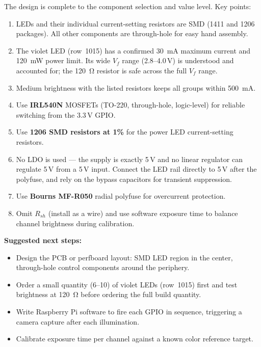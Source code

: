 \documentclass[12pt,letterpaper]{article}
\begin{document}
The design is complete to the component selection and value level. Key points:

\begin{enumerate}[leftmargin=2em]
  \item LEDs and their individual current-setting resistors are SMD (1411 and 1206 packages).
    All other components are through-hole for easy hand assembly.
  \item The violet LED (row~1015) has a confirmed 30~mA maximum current and 120~mW power
    limit. Its wide $V_f$ range (2.8--4.0\,V) is understood and accounted for; the
    120~\si{\ohm} resistor is safe across the full $V_f$ range.
  \item Medium brightness with the listed resistors keeps all groups within 500~mA.
  \item Use \textbf{IRL540N} MOSFETs (TO-220, through-hole, logic-level) for reliable
    switching from the 3.3\,V GPIO.
  \item Use \textbf{1206 SMD resistors at 1\%} for the power LED current-setting resistors.
  \item No LDO is used --- the supply is exactly 5\,V and no linear regulator can
    regulate 5\,V from a 5\,V input. Connect the LED rail directly to 5\,V after
    the polyfuse, and rely on the bypass capacitors for transient suppression.
  \item Use \textbf{Bourns MF-R050} radial polyfuse for overcurrent protection.
  \item Omit $R_{sh}$ (install as a wire) and use software exposure time to balance
    channel brightness during calibration.
\end{enumerate}

\textbf{Suggested next steps:}
\begin{itemize}[leftmargin=2em]
  \item Design the PCB or perfboard layout: SMD LED region in the center,
    through-hole control components around the periphery.
  \item Order a small quantity (6--10) of violet LEDs (row~1015) first and
    test brightness at 120~\si{\ohm} before ordering the full build quantity.
  \item Write Raspberry Pi software to fire each GPIO in sequence, triggering
    a camera capture after each illumination.
  \item Calibrate exposure time per channel against a known color reference target.
\end{itemize}
\end{document}
